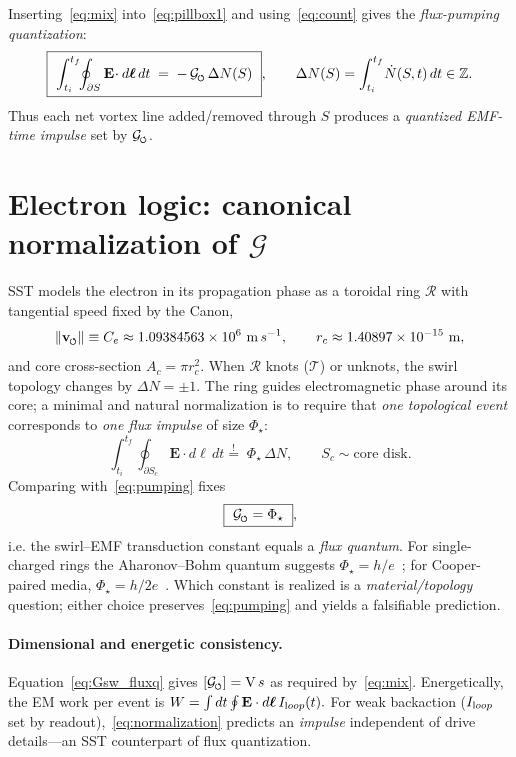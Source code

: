 \documentclass[reprint,aps,onecolumn,nofootinbib]{revtex4-2}
\newcommand{\swirlarrow}{%
	\mathchoice{\mkern-2mu\scriptstyle\boldsymbol{\circlearrowleft}}%
	{\mkern-2mu\scriptstyle\boldsymbol{\circlearrowleft}}%
	{\mkern-2mu\scriptscriptstyle\boldsymbol{\circlearrowleft}}%
	{\mkern-2mu\scriptscriptstyle\boldsymbol{\circlearrowleft}}%
}
\begin{document}
Inserting~\eqref{eq:mix} into~\eqref{eq:pillbox1} and using~\eqref{eq:count} gives the \emph{flux-pumping quantization}:
\begin{equation}
\boxed{\ \int_{t_i}^{t_f}\!\!\oint_{\partial S}\mathbf E\!\cdot d\boldsymbol\ell\,dt
\;=\; -\,\mathcal G_{\swirlarrow}\, \Delta N(S)\ },
\qquad \Delta N(S)=\int_{t_i}^{t_f}\!\dot N(S,t)\,dt \in \mathbb Z.
\label{eq:pumping}
\end{equation}
Thus each net vortex line added/removed through $S$ produces a \emph{quantized EMF-time impulse} set by $\mathcal G_{\swirlarrow}$.

\section{Electron logic: canonical normalization of $\mathcal G$}
SST models the electron in its propagation phase as a toroidal ring $\mathcal R$ with tangential speed fixed by the Canon,
\begin{equation}
\|\mathbf v_{\swirlarrow}\| \equiv C_e \approx 1.09384563\times 10^6~{\textrm m\,s^{-1}},
\qquad r_c \approx 1.40897\times 10^{-15}~{\textrm m},
\label{eq:canonCe}
\end{equation}
and core cross-section $A_c=\pi r_c^2$. When $\mathcal R$ knots ($\mathcal T$) or unknots, the swirl topology changes by $\Delta N=\pm 1$. The ring guides electromagnetic phase around its core; a minimal and natural normalization is to require that \emph{one topological event} corresponds to \emph{one flux impulse} of size $\Phi_\star$:
\begin{equation}
\int_{t_i}^{t_f}\!\!\oint_{\partial S_c}\mathbf E\!\cdot d\boldsymbol\ell\,dt
\stackrel{!}{=}\; \Phi_\star \,\Delta N,
\qquad S_c \sim \text{core disk}.
\label{eq:normalization}
\end{equation}
Comparing with~\eqref{eq:pumping} fixes
\begin{equation}
\boxed{\ \mathcal G_{\swirlarrow} = \Phi_\star \ },
\label{eq:Gsw_fluxq}
\end{equation}
i.e. the swirl--EMF transduction constant equals a \emph{flux quantum}. For single-charged rings the Aharonov--Bohm quantum suggests $\Phi_\star=h/e$~\cite{Aharonov1959}; for Cooper-paired media, $\Phi_\star=h/2e$~\cite{Tinkham2004}. Which constant is realized is a \emph{material/topology} question; either choice preserves~\eqref{eq:pumping} and yields a falsifiable prediction.

\paragraph{Dimensional and energetic consistency.}
    Equation~\eqref{eq:Gsw_fluxq} gives $[\mathcal G_{\swirlarrow}]={\textrm V\,s}$ as required by~\eqref{eq:mix}. Energetically, the EM work per event is
    \(
    W=\int dt\oint \mathbf E\cdot d\boldsymbol\ell\,I_{\textrm loop}(t).
    \)
    For weak backaction ($I_{\textrm loop}$ set by readout),~\eqref{eq:normalization} predicts an \emph{impulse} independent of drive details—an SST counterpart of flux quantization.
\end{document}
